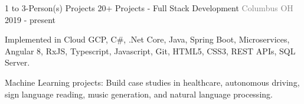 \begin{cventries}
    \vspace{-2mm}   \cventry
    {1 to 3-Person(s) Projects}
    {\hspace*{0.5mm}\bullet \hspace*{0.5mm} 20+ Projects - Full Stack Development}
    {\textcolor{graytext}{Columbus OH}}
    {2019 - present}
    {
      \begin{cvitems}
        \item {Implemented in Cloud GCP, C\#, .Net Core, Java, Spring Boot, Microservices, Angular 8, RxJS, Typescript, Javascript, Git, HTML5, CSS3, REST APIs, SQL Server.} \item {Machine Learning projects: Build case studies in healthcare, autonomous driving, sign language reading, music generation, and natural language processing.}   
      \end{cvitems}   \vspace{-2mm} 
    }
\end{cventries}
